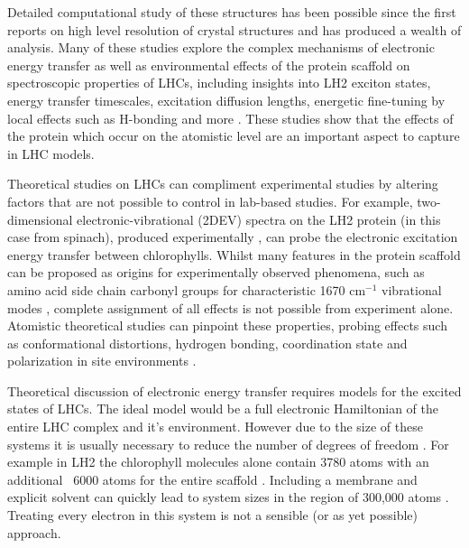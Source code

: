 Detailed computational study of these structures has been possible since the first
reports on high level resolution of crystal structures \cite{Mcdermott1995, Koepke1996} 
and has produced a wealth of analysis. Many of these studies explore the complex 
mechanisms of electronic energy transfer as well as environmental effects of the 
protein scaffold on spectroscopic properties of LHCs, including insights into LH2
exciton states\cite{Calhoun2009}, energy transfer timescales\cite{Akhtar2020, Moulisova2009},
excitation diffusion lengths\cite{Amarnath2016}, energetic fine-tuning by local 
effects such as H-bonding\cite{Mennucci2019, Montemayor2018} and more \cite{SlaMa2020, Jang2015, Curutchet2016, Mirkovic2016}. 
These studies show that the effects of the protein which occur on the atomistic
level are an important aspect to capture in LHC models.

Theoretical studies on LHCs can compliment experimental studies by altering factors
that are not possible to control in lab-based studies. For example, two-dimensional
electronic-vibrational (2DEV) spectra on the LH2 protein (in this case from spinach), 
produced experimentally \cite{CLewis2016}, can probe the electronic excitation energy
transfer between chlorophylls. Whilst many features in the protein scaffold can 
be proposed as origins for experimentally observed phenomena, such as amino acid
side chain carbonyl groups for characteristic 1670 $\text{cm}^{-1}$ vibrational 
modes \cite{Barth2000}, complete assignment of all effects is not possible from 
experiment alone. Atomistic theoretical studies can pinpoint these properties, probing
effects such as conformational distortions, hydrogen bonding, coordination state
and polarization in site environments \cite{CLewis2016, Lewis2015}.  

Theoretical discussion of electronic energy transfer requires models for the excited
states of LHCs. The ideal model would be a full electronic Hamiltonian of the entire
LHC complex and it's environment. However due to the size of these systems it is
usually necessary to reduce the number of degrees of freedom \cite{Mallus2018, SlaMa2020}. 
For example in LH2 the chlorophyll molecules alone contain 3780 atoms with an additional 
~6000 atoms for the entire scaffold \cite{Neugebauer2008, Cherezov2006}. Including
a membrane and explicit solvent can quickly lead to system sizes in the region of
300,000 atoms \cite{Mennucci2019}. Treating every electron in this system is not
a sensible (or as yet possible) approach.

